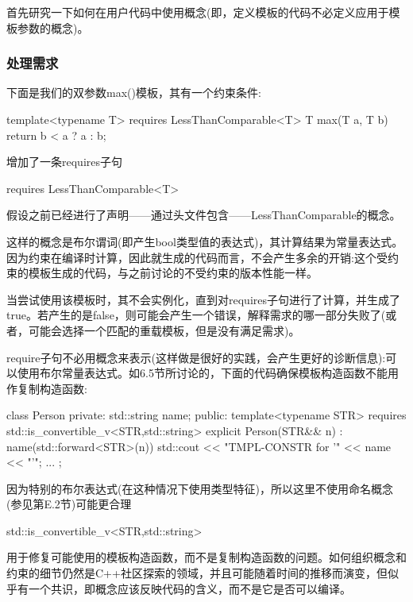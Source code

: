
首先研究一下如何在用户代码中使用概念(即，定义模板的代码不必定义应用于模板参数的概念)。

\subsubsection{处理需求}

下面是我们的双参数max()模板，其有一个约束条件:

\begin{cpp}
template<typename T> requires LessThanComparable<T>
T max(T a, T b) {
	return b < a ? a : b;
}
\end{cpp}

增加了一条requires子句

\begin{cpp}
requires LessThanComparable<T>
\end{cpp}

假设之前已经进行了声明——通过头文件包含——LessThanComparable的概念。

这样的概念是布尔谓词(即产生bool类型值的表达式)，其计算结果为常量表达式。因为约束在编译时计算，因此就生成的代码而言，不会产生多余的开销:这个受约束的模板生成的代码，与之前讨论的不受约束的版本性能一样。

当尝试使用该模板时，其不会实例化，直到对requires子句进行了计算，并生成了true。若产生的是false，则可能会产生一个错误，解释需求的哪一部分失败了(或者，可能会选择一个匹配的重载模板，但是没有满足需求)。

require子句不必用概念来表示(这样做是很好的实践，会产生更好的诊断信息):可以使用布尔常量表达式。如6.5节所讨论的，下面的代码确保模板构造函数不能用作复制构造函数:

\begin{cpp}
class Person
{
	private:
	std::string name;
	public:
	template<typename STR>
	requires std::is_convertible_v<STR,std::string>
	explicit Person(STR&& n)
	: name(std::forward<STR>(n)) {
		std::cout << "TMPL-CONSTR for ’" << name << "’\n";
	}
	...
};
\end{cpp}

因为特别的布尔表达式(在这种情况下使用类型特征)，所以这里不使用命名概念(参见第E.2节)可能更合理

\begin{cpp}
std::is_convertible_v<STR,std::string>
\end{cpp}

用于修复可能使用的模板构造函数，而不是复制构造函数的问题。如何组织概念和约束的细节仍然是C++社区探索的领域，并且可能随着时间的推移而演变，但似乎有一个共识，即概念应该反映代码的含义，而不是它是否可以编译。

